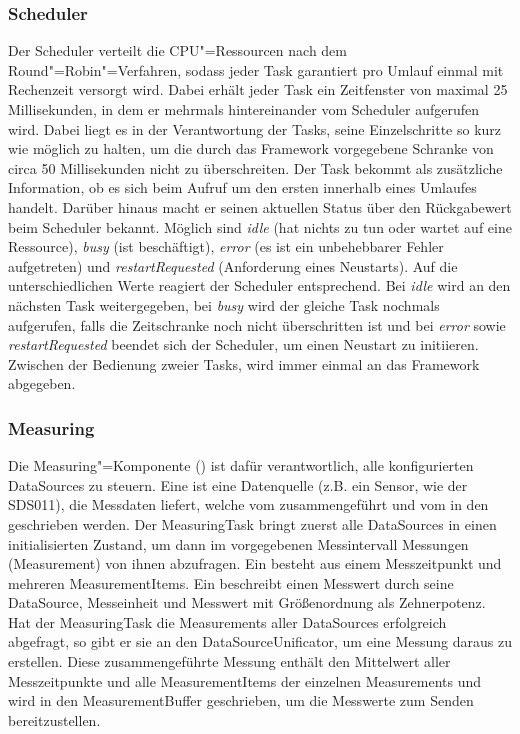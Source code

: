 \subsubsection{Scheduler}
Der Scheduler verteilt die CPU"=Ressourcen nach dem Round"=Robin"=Verfahren, sodass jeder Task garantiert pro Umlauf einmal mit Rechenzeit versorgt wird.
Dabei erhält jeder Task ein Zeitfenster von maximal 25 Millisekunden, in dem er mehrmals hintereinander vom Scheduler aufgerufen wird.
Dabei liegt es in der Verantwortung der Tasks, seine Einzelschritte so kurz wie möglich zu halten, um die durch das Framework vorgegebene Schranke von circa 50 Millisekunden nicht zu überschreiten.
Der Task bekommt als zusätzliche Information, ob es sich beim Aufruf um den ersten innerhalb eines Umlaufes handelt.
Darüber hinaus macht er seinen aktuellen Status über den Rückgabewert beim Scheduler bekannt.
Möglich sind \textit{idle} (hat nichts zu tun oder wartet auf eine Ressource), \textit{busy} (ist beschäftigt), \textit{error} (es ist ein unbehebbarer Fehler aufgetreten) und \textit{restartRequested} (Anforderung eines Neustarts).
Auf die unterschiedlichen Werte reagiert der Scheduler entsprechend.
Bei \textit{idle} wird an den nächsten Task weitergegeben, bei \textit{busy} wird der gleiche Task nochmals aufgerufen, falls die Zeitschranke noch nicht überschritten ist und bei \textit{error} sowie \textit{restartRequested} beendet sich der Scheduler, um einen Neustart zu initiieren.
Zwischen der Bedienung zweier Tasks, wird immer einmal an das Framework abgegeben.

\subsubsection{Measuring}
Die Measuring"=Komponente () ist dafür verantwortlich, alle konfigurierten DataSources zu steuern.
Eine  ist eine Datenquelle (z.B. ein Sensor, wie der SDS011), die Messdaten liefert, welche vom  zusammengeführt und vom  in den  geschrieben werden.
Der MeasuringTask bringt zuerst alle DataSources in einen initialisierten Zustand, um dann im vorgegebenen Messintervall Messungen (Measurement) von ihnen abzufragen.
Ein  besteht aus einem Messzeitpunkt und mehreren MeasurementItems.
Ein  beschreibt einen Messwert durch seine DataSource, Messeinheit und Messwert mit Größenordnung als Zehnerpotenz.
Hat der MeasuringTask die Measurements aller DataSources erfolgreich abgefragt, so gibt er sie an den DataSourceUnificator, um eine Messung daraus zu erstellen.
Diese zusammengeführte Messung enthält den Mittelwert aller Messzeitpunkte und alle MeasurementItems der einzelnen Measurements und wird in den MeasurementBuffer geschrieben, um die Messwerte zum Senden bereitzustellen.

